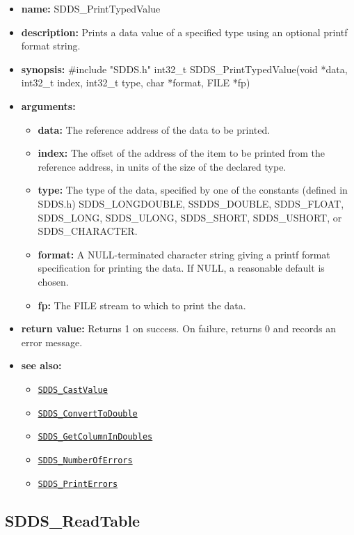 \documentclass[11pt]{article}
\newcommand{\progref}[1]{\hyperref[SDDS_#1]{\tt SDDS\_#1}}
\begin{document}
\begin{itemize}
\item {\bf name:}\newline
SDDS\_PrintTypedValue
\item {\bf description:}\newline
Prints a data value of a specified type using an optional  printf format string.
\item {\bf synopsis:} \#include "SDDS.h"\newline
int32\_t SDDS\_PrintTypedValue(void *data, int32\_t index, int32\_t type, char *format, FILE *fp)
\item {\bf arguments:}
\begin{itemize}
\item {\bf data:} The reference address of the data to be printed.
\item {\bf index:} The offset of the address of the item to be printed from the reference address, in units of the size of the declared type.
\item {\bf type:} The type of the data, specified by one of the constants (defined in SDDS.h) SDDS\_LONGDOUBLE, SSDDS\_DOUBLE, SDDS\_FLOAT, SDDS\_LONG, SDDS\_ULONG, SDDS\_SHORT, SDDS\_USHORT, or SDDS\_CHARACTER.
\item {\bf format:} A NULL-terminated character string giving a  printf format specification for printing the data. If NULL, a reasonable default is chosen.
\item {\bf fp:} The FILE stream to which to print the data.
\end{itemize}
\item {\bf return value:}\newline
Returns 1 on success. On failure, returns 0 and records an error message.
\item {\bf see also:}
\begin{itemize}
\item \progref{CastValue}
\item \progref{ConvertToDouble}
\item \progref{GetColumnInDoubles}
\item \progref{NumberOfErrors}
\item \progref{PrintErrors}
\end{itemize}
\end{itemize}

\subsection{SDDS\_ReadTable}
\label{SDDS_ReadTable}
\end{document}
